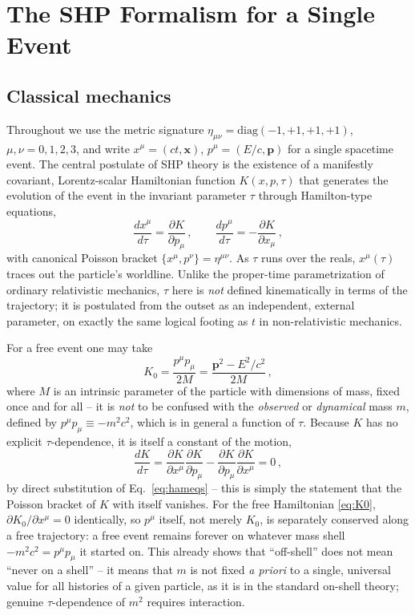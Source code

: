 \documentclass[11pt]{article}
\newcommand{\eqn}[1]{Eq.~\eqref{#1}}
\begin{document}
\section{The SHP Formalism for a Single Event}
\label{sec:single}

\subsection{Classical mechanics}

Throughout we use the metric signature $\eta_{\mu\nu}=\mathrm{diag}(-1,+1,+1,+1)$,
$\mu,\nu=0,1,2,3$, and write $x^\mu=(ct,\bm x)$, $p^\mu=(E/c,\bm p)$ for a single
spacetime event. The central postulate of SHP theory is the existence of a
manifestly covariant, Lorentz-scalar Hamiltonian function $K(x,p,\tau)$ that
generates the evolution of the event in the invariant parameter $\tau$ through
Hamilton-type equations,
\begin{equation}
\frac{dx^\mu}{d\tau}=\frac{\partial K}{\partial p_\mu}\,,\qquad
\frac{dp^\mu}{d\tau}=-\frac{\partial K}{\partial x_\mu}\,,
\label{eq:hameqs}
\end{equation}
with canonical Poisson bracket $\{x^\mu,p^\nu\}=\eta^{\mu\nu}$. As $\tau$ runs
over the reals, $x^\mu(\tau)$ traces out the particle's worldline. Unlike the
proper-time parametrization of ordinary relativistic mechanics, $\tau$ here is
\emph{not} defined kinematically in terms of the trajectory; it is postulated
from the outset as an independent, external parameter, on exactly the same
logical footing as $t$ in non-relativistic mechanics.

For a free event one may take
\begin{equation}
K_0=\frac{p^\mu p_\mu}{2M}=\frac{\bm p^2-E^2/c^2}{2M}\,,
\label{eq:K0}
\end{equation}
where $M$ is an intrinsic parameter of the particle with dimensions of mass,
fixed once and for all -- it is \emph{not} to be confused with the
\emph{observed} or \emph{dynamical} mass $m$, defined by
$p^\mu p_\mu\equiv -m^2c^2$, which is in general a function of $\tau$. Because
$K$ has no explicit $\tau$-dependence, it is itself a constant of the motion,
\begin{equation}
\frac{dK}{d\tau}=\frac{\partial K}{\partial x^\mu}\frac{\partial K}{\partial p_\mu}
-\frac{\partial K}{\partial p_\mu}\frac{\partial K}{\partial x^\mu}=0\,,
\label{eq:Kconserved}
\end{equation}
by direct substitution of \eqn{eq:hameqs} -- this is simply the statement that
the Poisson bracket of $K$ with itself vanishes. For the free Hamiltonian
\eqref{eq:K0}, $\partial K_0/\partial x^\mu=0$ identically, so $p^\mu$ itself,
not merely $K_0$, is separately conserved along a free trajectory: a free event
remains forever on whatever mass shell $-m^2c^2=p^\mu p_\mu$ it started on. This
already shows that ``off-shell'' does not mean ``never on a shell'' -- it means
that $m$ is not fixed \emph{a priori} to a single, universal value for all
histories of a given particle, as it is in the standard on-shell theory;
genuine $\tau$-dependence of $m^2$ requires interaction.
\end{document}
